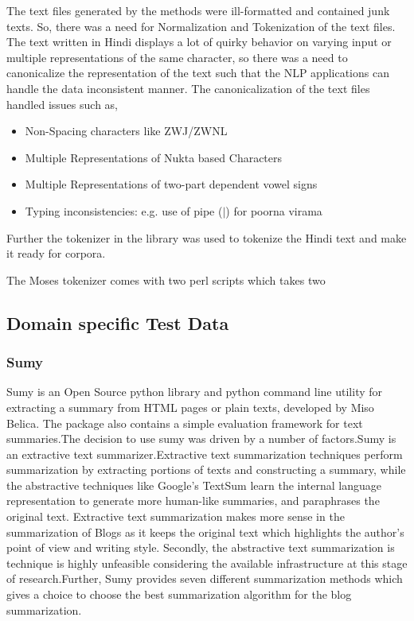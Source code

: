 The text files generated by the methods were ill-formatted and contained junk texts. So, there was a need for Normalization and Tokenization of the text files. The text written in Hindi displays a lot of quirky behavior on varying input or multiple representations of the same character, so there was a need to canonicalize the representation of the text such that the NLP applications can handle the data inconsistent manner. The canonicalization of the text files handled issues such as,
\begin{itemize}
\item Non-Spacing characters like ZWJ/ZWNL
\item Multiple Representations of Nukta based Characters
\item Multiple Representations of two-part dependent vowel signs
\item Typing inconsistencies: e.g. use of pipe ($|$) for poorna virama 
\end{itemize}

Further the tokenizer in the library was used to tokenize the Hindi text and make it ready for corpora.

The Moses tokenizer comes with two perl scripts which takes two

\subsection{Domain specific Test Data}
\subsubsection{Sumy}
Sumy is an Open Source python library and python command line utility for extracting a summary from HTML pages or plain texts, developed by Miso Belica. The package also contains a simple evaluation framework for text summaries.The decision to use sumy was driven by a number of factors.Sumy is an extractive text summarizer.Extractive text summarization techniques perform summarization by extracting portions of texts and constructing a summary, while the abstractive techniques like Google's TextSum learn the internal language representation to generate more human-like summaries,
and paraphrases the original text. Extractive text summarization makes more sense in the summarization of Blogs as it keeps the original text which highlights the author’s point of view and writing style. Secondly, the abstractive text summarization is technique is highly unfeasible considering the available infrastructure at this stage of research.Further, Sumy provides seven different summarization methods which gives a choice to choose the best summarization algorithm for the blog summarization. 

